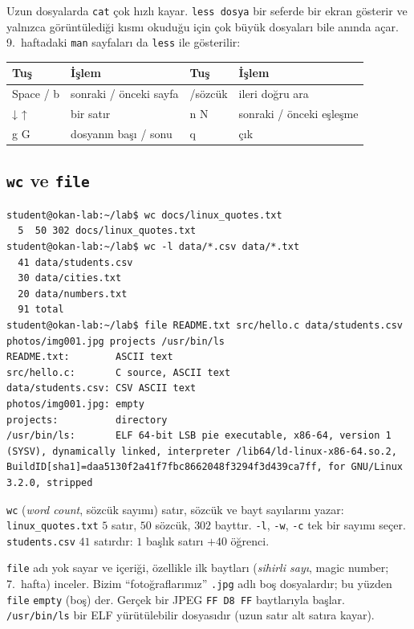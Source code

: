 \documentclass[11pt,a4paper]{article}
\newcommand{\cmd}[1]{\texttt{#1}}
\begin{document}
Uzun dosyalarda \cmd{cat} çok hızlı kayar. \cmd{less dosya} bir seferde bir ekran gösterir ve yalnızca görüntülediği kısmı okuduğu için çok büyük dosyaları bile anında açar. 9.~haftadaki \cmd{man} sayfaları da \cmd{less} ile gösterilir:

\begin{center}
\renewcommand{\arraystretch}{1.15}
\begin{tabular}{@{}>{\ttfamily}l l >{\ttfamily}l l@{}}
\toprule
\textrm{\textbf{Tuş}} & \textbf{İşlem} & \textrm{\textbf{Tuş}} & \textbf{İşlem} \\
\midrule
Space / b & sonraki / önceki sayfa & /sözcük & ileri doğru ara \\
↓ ↑ & bir satır & n  N & sonraki / önceki eşleşme \\
g  G & dosyanın başı / sonu & q & çık \\
\bottomrule
\end{tabular}
\end{center}

\subsection{\texttt{wc} ve \texttt{file}}

\begin{lstlisting}[style=term]
student@okan-lab:~/lab$ wc docs/linux_quotes.txt
  5  50 302 docs/linux_quotes.txt
student@okan-lab:~/lab$ wc -l data/*.csv data/*.txt
  41 data/students.csv
  30 data/cities.txt
  20 data/numbers.txt
  91 total
student@okan-lab:~/lab$ file README.txt src/hello.c data/students.csv photos/img001.jpg projects /usr/bin/ls
README.txt:        ASCII text
src/hello.c:       C source, ASCII text
data/students.csv: CSV ASCII text
photos/img001.jpg: empty
projects:          directory
/usr/bin/ls:       ELF 64-bit LSB pie executable, x86-64, version 1 (SYSV), dynamically linked, interpreter /lib64/ld-linux-x86-64.so.2, BuildID[sha1]=daa5130f2a41f7fbc8662048f3294f3d439ca7ff, for GNU/Linux 3.2.0, stripped
\end{lstlisting}

\cmd{wc} (\emph{word count}, sözcük sayımı) satır, sözcük ve bayt sayılarını yazar: \texttt{linux\_quotes.txt} $5$ satır, $50$ sözcük, $302$ bayttır. \cmd{-l}, \cmd{-w}, \cmd{-c} tek bir sayımı seçer. \texttt{students.csv} $41$ satırdır: $1$ başlık satırı $+ 40$ öğrenci.

\cmd{file} adı yok sayar ve içeriği, özellikle ilk baytları (\emph{sihirli sayı}, magic number; 7.~hafta) inceler. Bizim ``fotoğraflarımız'' \texttt{.jpg} adlı boş dosyalardır; bu yüzden \cmd{file} \texttt{empty} (boş) der. Gerçek bir JPEG \texttt{FF D8 FF} baytlarıyla başlar. \texttt{/usr/bin/ls} bir ELF yürütülebilir dosyasıdır (uzun satır alt satıra kayar).
\end{document}
